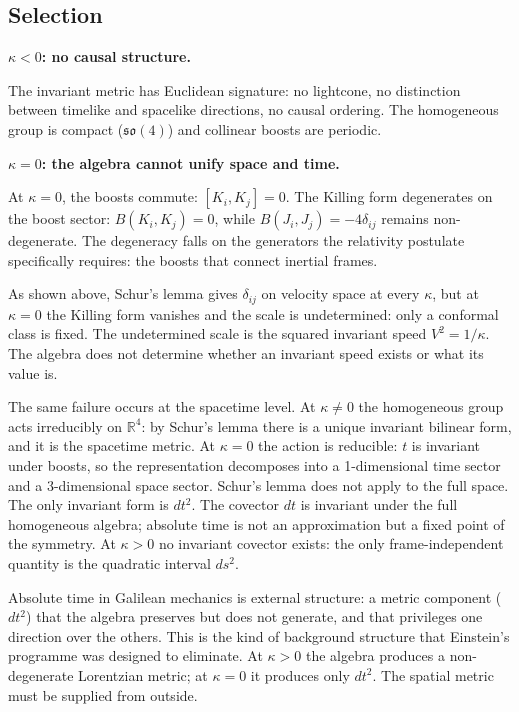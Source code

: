 \documentclass[11pt]{article}
\begin{document}
\subsection*{Selection}

\textbf{$\kappa < 0$: no causal structure.}

\smallskip
The invariant metric has Euclidean signature: no lightcone, no distinction between timelike and spacelike directions, no causal ordering. The homogeneous group is compact ($\mathfrak{so}(4)$) and collinear boosts are periodic.

\bigskip
\textbf{$\kappa = 0$: the algebra cannot unify space and time.}

\smallskip
At $\kappa = 0$, the boosts commute: $[K_i,K_j] = 0$. The Killing form degenerates on the boost sector: $B(K_i,K_j) = 0$, while $B(J_i,J_j) = -4\delta_{ij}$ remains non-degenerate. The degeneracy falls on the generators the relativity postulate specifically requires: the boosts that connect inertial frames.

As shown above, Schur's lemma gives $\delta_{ij}$ on velocity space at every $\kappa$, but at $\kappa = 0$ the Killing form vanishes and the scale is undetermined: only a conformal class is fixed. The undetermined scale is the squared invariant speed $V^2 = 1/\kappa$. The algebra does not determine whether an invariant speed exists or what its value is.

The same failure occurs at the spacetime level. At $\kappa \neq 0$ the homogeneous group acts irreducibly on $\mathbb{R}^4$: by Schur's lemma there is a unique invariant bilinear form, and it is the spacetime metric. At $\kappa = 0$ the action is reducible: $t$ is invariant under boosts, so the representation decomposes into a 1-dimensional time sector and a 3-dimensional space sector. Schur's lemma does not apply to the full space. The only invariant form is $dt^2$. The covector $dt$ is invariant under the full homogeneous algebra; absolute time is not an approximation but a fixed point of the symmetry. At $\kappa > 0$ no invariant covector exists: the only frame-independent quantity is the quadratic interval $ds^2$.

Absolute time in Galilean mechanics is external structure: a metric component ($dt^2$) that the algebra preserves but does not generate, and that privileges one direction over the others. This is the kind of background structure that Einstein's programme was designed to eliminate. At $\kappa > 0$ the algebra produces a non-degenerate Lorentzian metric; at $\kappa = 0$ it produces only $dt^2$. The spatial metric must be supplied from outside.
\end{document}

